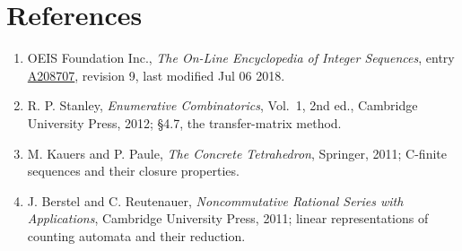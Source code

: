 \documentclass[11pt]{article}
\theoremstyle{definition}
\begin{document}
\section{References}

\begin{enumerate}

\item OEIS Foundation Inc., \emph{The On-Line Encyclopedia of Integer Sequences}, entry \href{https://oeis.org/A208707}{A208707}, revision 9, last modified Jul 06 2018.

\item R. P. Stanley, \emph{Enumerative Combinatorics}, Vol.~1, 2nd ed., Cambridge University Press, 2012; \S4.7, the transfer-matrix method.

\item M. Kauers and P. Paule, \emph{The Concrete Tetrahedron}, Springer, 2011; C-finite sequences and their closure properties.

\item J. Berstel and C. Reutenauer, \emph{Noncommutative Rational Series with Applications}, Cambridge University Press, 2011; linear representations of counting automata and their reduction.

\end{enumerate}
\end{document}
